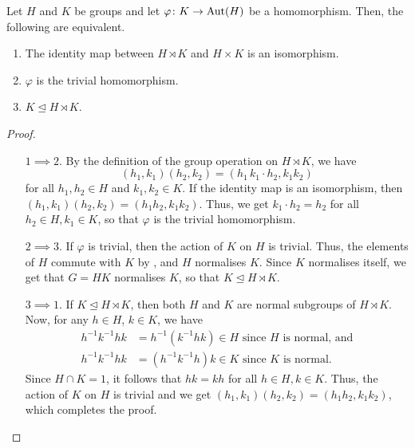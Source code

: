 \begin{prop}
    Let $H$ and $K$ be groups and let $\varphi \colon K \to \operatorname{Aut}(H)$ be a homomorphism. Then, the following are equivalent. 
    \begin{enumerate}
        \item The identity map between $H \rtimes K$ and $H \times K$ is an isomorphism. 
        \item $\varphi$ is the trivial homomorphism.
        \item $K \trianglelefteq H \rtimes K$.
    \end{enumerate}
\end{prop}
\begin{proof}
    \phantom{hi}
    \begin{enumerate}
        \item[$1 \implies 2.$] By the definition of the group operation on $H \rtimes K$, we have
        \[
            (h_1, k_1)(h_2, k_2) = (h_1 \, k_1 \cdot h_2, k_1k_2)
        \]
        for all $h_1, h_2 \in H$ and $k_1, k_2 \in K$. If the identity map is an isomorphism, then $(h_1, k_1)(h_2, k_2) = (h_1h_2, k_1k_2)$. Thus, we get $k_1 \cdot h_2 = h_2$ for all $h_2 \in H, k_1 \in K$, so that $\varphi$ is the trivial homomorphism. 
        
        \item[$2 \implies 3.$] If $\varphi$ is trivial, then the action of $K$ on $H$ is trivial. Thus, the elements of $H$ commute with $K$ by , and $H$ normalises $K$. Since $K$ normalises itself, we get that $G = HK$ normalises $K$, so that $K \trianglelefteq H \rtimes K$.
        
        \item[$3 \implies 1.$] If $K \trianglelefteq H \rtimes K$, then both $H$ and $K$ are normal subgroups of $H \rtimes K$. Now, for any $h \in H$, $k \in K$, we have
        \begin{align*}
            h^{-1}k^{-1}hk &= h^{-1}(k^{-1}hk) \in H \text{ since $H$ is normal, and} \\
            h^{-1}k^{-1}hk &= (h^{-1}k^{-1}h)k \in K \text{ since $K$ is normal}.
        \end{align*}
        Since $H \cap K = 1$, it follows that $hk = kh$ for all $h \in H, k \in K$. Thus, the action of $K$ on $H$ is trivial and we get $(h_1,k_1)(h_2,k_2) = (h_1h_2, k_1k_2)$, which completes the proof. \qedhere
    \end{enumerate}
\end{proof}

